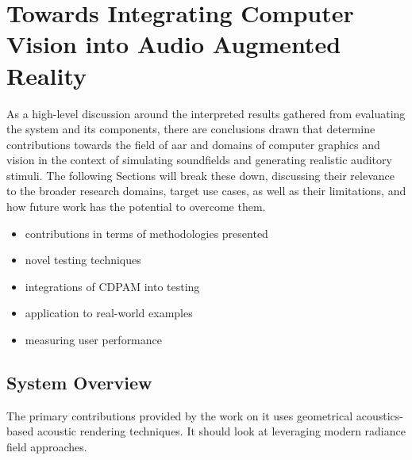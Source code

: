 \section{Towards Integrating Computer Vision into Audio Augmented Reality}
As a high-level discussion around the interpreted results gathered from evaluating the system and its components, there are conclusions drawn that determine contributions towards the field of \acrfull{aar} and domains of computer graphics and vision in the context of simulating soundfields and generating realistic auditory stimuli. The following Sections will break these down, discussing their relevance to the broader research domains, target use cases, as well as their limitations, and how future work has the potential to overcome them.

\begin{itemize}
    \item contributions in terms of methodologies presented
    \item novel testing techniques
    \item integrations of CDPAM into testing
    \item application to real-world examples 
    \item measuring user performance
\end{itemize}

\subsection{System Overview}
The primary contributions provided by the work on 
it uses geometrical acoustics-based acoustic rendering techniques. It should look at leveraging modern radiance field approaches.


